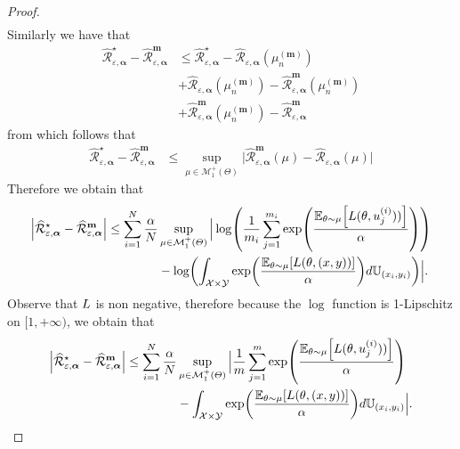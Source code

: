 \begin{proof}
\begin{align*}
\end{align*}
Similarly we have that
\begin{align*}
\widehat{\mathcal{R}}^{\star}_{\varepsilon,\bm{\alpha}} - \widehat{\mathcal{R}}^{\textbf{m}}_{\varepsilon,\bm{\alpha}}&\leq \widehat{\mathcal{R}}^{\star}_{\varepsilon,\bm{\alpha}} -
\widehat{\mathcal{R}}_{\varepsilon,\bm{\alpha}}(\mu_n^{(\bm{m})})\\
&+\widehat{\mathcal{R}}_{\varepsilon,\bm{\alpha}}(\mu_n^{(\bm{m})}) - \widehat{\mathcal{R}}^{\textbf{m}}_{\varepsilon,\bm{\alpha}}(\mu_n^{(\bm{m})}) \\
&+ \widehat{\mathcal{R}}^{\textbf{m}}_{\varepsilon,\bm{\alpha}}(\mu_n^{(\bm{m})}) - \widehat{\mathcal{R}}^{\textbf{m}}_{\varepsilon,\bm{\alpha}}
\end{align*}
from which follows that 
\begin{align*}
\widehat{\mathcal{R}}^{\star}_{\varepsilon,\bm{\alpha}} - \widehat{\mathcal{R}}^{\textbf{m}}_{\varepsilon,\bm{\alpha}}&\leq  \sup_{\mu\in \mathcal{M}^+_1(\Theta)}\Big|\widehat{\mathcal{R}}^{\textbf{m}}_{\varepsilon,\bm{\alpha}}(\mu) - \widehat{\mathcal{R}}_{\varepsilon,\bm{\alpha}}(\mu) \Big| 
\end{align*}
Therefore we obtain that 
\begin{align*}
\Big| \widehat{\mathcal{R}}^{\star}_{\varepsilon,\bm{\alpha}} - \widehat{\mathcal{R}}^{\textbf{m}}_{\varepsilon,\bm{\alpha}}\Big |\leq 
\sum_{i=1}^\numsamples\frac{\alpha}{\numsamples}  &\sup_{\mu\in \mathcal{M}^+_1(\Theta)}\Big|\log\left(\frac{1}{m_i}\sum_{j=1}^{m_i}\exp\left(\frac{\mathbb{E}_{\theta \sim \mu}\left[\loss(\theta,u_j^{(i)}))\right]}{\alpha}\right)\right)\\
    &- \log\left(\int_{\mathcal{X}\times\mathcal{Y}}\exp\left(\frac{\mathbb{E}_{\theta \sim \mu}\left[\loss(\theta,(x,y))\right]}{\alpha}\right) d\mathbb{U}_{(x_i,y_i)} \right)\Big|.
\end{align*}
Observe that $L$ is non negative, therefore because the $\log$ function is 1-Lipschitz on $[1,+\infty)$, we obtain that 
\begin{align*}
\Big| \widehat{\mathcal{R}}^{\star}_{\varepsilon,\bm{\alpha}} - \widehat{\mathcal{R}}^{\textbf{m}}_{\varepsilon,\bm{\alpha}}\Big |
\leq 
\sum_{i=1}^\numsamples\frac{\alpha}{\numsamples}  &\sup_{\mu\in \mathcal{M}^+_1(\Theta)}\Big |\frac{1}{m}\sum_{j=1}^{m}\exp\left(\frac{\mathbb{E}_{\theta \sim \mu}\left[\loss(\theta,u_j^{(i)}))\right]}{\alpha}\right)\\
    &- \int_{\mathcal{X}\times\mathcal{Y}}\exp\left(\frac{\mathbb{E}_{\theta \sim \mu}\left[\loss(\theta,(x,y))\right]}{\alpha}\right) d\mathbb{U}_{(x_i,y_i)} \Big|.

\end{align*}
\end{proof}
